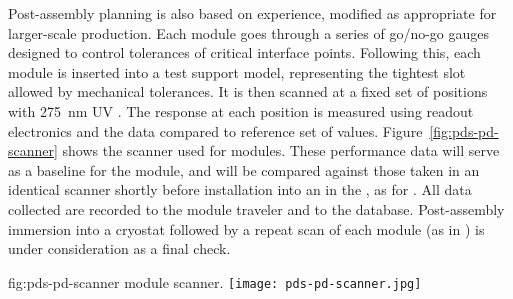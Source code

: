 Post-assembly  planning is also based on  experience, modified as appropriate for larger-scale production.  Each  module goes through a series of go/no-go gauges 
designed to control tolerances of critical interface points.  Following this, each module is inserted into a test  support model, representing the tightest slot allowed by  mechanical tolerances.
It is then scanned at a fixed set of positions with \SI{275}{nm} UV .  
The  response at each position is measured using  readout electronics and the data compared to reference set of values.
Figure~\ref{fig:pds-pd-scanner} shows %
the scanner used for  modules. These performance data will serve as a baseline for the  module, and will be compared against those taken in an identical scanner shortly before installation into an  in the , as for . %
All data collected are recorded to the module traveler and to the   database.
Post-assembly immersion into a  cryostat followed by a repeat scan of each  module (as in ) is under consideration as a final  check.

\begin{dunefigure}{fig:pds-pd-scanner}
{ module scanner.}
  \texttt{[image: pds-pd-scanner.jpg]}
\end{dunefigure}


